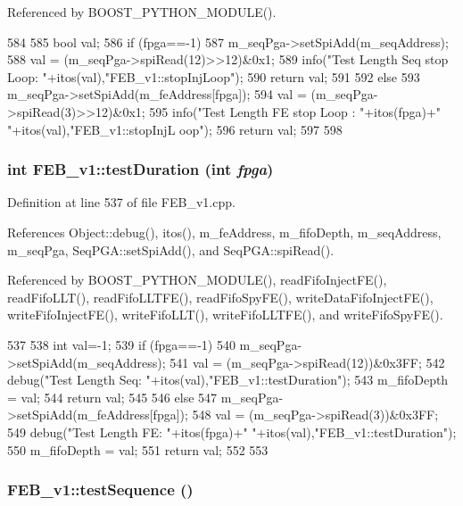 Referenced by BOOST\_\-PYTHON\_\-MODULE().


\begin{DoxyCode}
584                                 {
585   bool val;
586   if (fpga==-1){
587     m_seqPga->setSpiAdd(m_seqAddress);
588     val = (m_seqPga->spiRead(12)>>12)&0x1;
589     info("Test Length Seq stop Loop: "+itos(val),"FEB_v1::stopInjLoop");
590     return val;
591   }
592   else {
593     m_seqPga->setSpiAdd(m_feAddress[fpga]);
594     val = (m_seqPga->spiRead(3)>>12)&0x1;
595     info("Test Length FE stop Loop : "+itos(fpga)+" "+itos(val),"FEB_v1::stopInjL
      oop");
596     return val;
597   }
598 }
\end{DoxyCode}
\hypertarget{classFEB__v1_a7f1db8ca9490172fce7603da9e703dec}{
\subsubsection[{testDuration}]{\setlength{\rightskip}{0pt plus 5cm}int FEB\_\-v1::testDuration (int {\em fpga})}}
\label{classFEB__v1_a7f1db8ca9490172fce7603da9e703dec}


Definition at line 537 of file FEB\_\-v1.cpp.

References Object::debug(), itos(), m\_\-feAddress, m\_\-fifoDepth, m\_\-seqAddress, m\_\-seqPga, SeqPGA::setSpiAdd(), and SeqPGA::spiRead().

Referenced by BOOST\_\-PYTHON\_\-MODULE(), readFifoInjectFE(), readFifoLLT(), readFifoLLTFE(), readFifoSpyFE(), writeDataFifoInjectFE(), writeFifoInjectFE(), writeFifoLLT(), writeFifoLLTFE(), and writeFifoSpyFE().


\begin{DoxyCode}
537                                 {
538   int val=-1;
539   if (fpga==-1){
540     m_seqPga->setSpiAdd(m_seqAddress);
541     val = (m_seqPga->spiRead(12))&0x3FF;
542     debug("Test Length Seq: "+itos(val),"FEB_v1::testDuration");
543     m_fifoDepth = val;
544     return val;
545   }
546   else {
547     m_seqPga->setSpiAdd(m_feAddress[fpga]);
548     val = (m_seqPga->spiRead(3))&0x3FF;
549     debug("Test Length FE: "+itos(fpga)+" "+itos(val),"FEB_v1::testDuration");
550     m_fifoDepth = val;
551     return val;
552   }
553 }
\end{DoxyCode}
\hypertarget{classFEB__v1_a7b948b40f3034ccfb0a696b5cf9c5c6c}{
\subsubsection[{testSequence}]{ FEB\_\-v1::testSequence ()}}
\label{classFEB__v1_a7b948b40f3034ccfb0a696b5cf9c5c6c}


